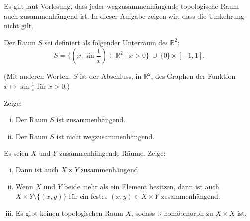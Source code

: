 \begin{aufgabe}
Es gilt laut Vorlesung, dass jeder wegzusammenhängende topologische Raum auch zusammenhängend ist. In dieser Aufgabe zeigen wir, dass die Umkehrung nicht gilt.
 
Der Raum $S$ sei definiert als folgender Unterraum
des $\mathbb{R}^2$:
\[S = \Big\{ \left(x,\sin \frac{1}{x}\right) \in \mathbb{R}^2 \mid x > 0\Big\}
\ \cup \ \{0\} \times [-1,1].\]

\hspace*{-1cm}
(Mit anderen Worten: $S$ ist der Abschluss, in $\mathbb{R}^2$, des Graphen
der Funktion $x \mapsto \sin \frac{1}{x}$ für $x > 0$.)

Zeige: 
\begin{enumerate}[i)]
\item Der Raum $S$ ist zusammenhängend.
\item Der Raum $S$ ist nicht wegzusammenhängend.
\end{enumerate}
\begin{minipage}{\textwidth}
    \centering
\end{minipage}
\end{aufgabe}

\begin{aufgabe}
Es seien $X$ und $Y$ zusammenhängende Räume. Zeige:
\begin{enumerate}[i)]
	\item Dann ist auch $X\times Y$ zusammenhängend.
	\item Wenn $X$ und $Y$ beide mehr als ein Element besitzen, dann ist auch $X\times Y\setminus \{(x,y)\}$ für ein festes $(x,y)\in X\times Y$ zusammenhängend.
	\item Es gibt keinen topologischen Raum $X$, sodass $\mathbb R$ homöomorph zu $X\times X$ ist.
\end{enumerate}
\end{aufgabe}

